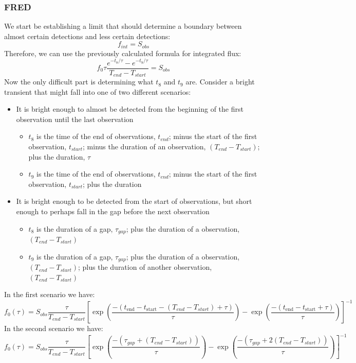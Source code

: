 \documentclass{article}
\begin{document}
\subsubsection{FRED}
We start be establishing a limit that should determine a boundary between almost certain detections and less certain detections:
\[f_{int} = S_{obs}\]
Therefore, we can use the previously calculated formula for integrated flux:
\[f_0\tau \frac{e^{-t_{8}/\tau}-e^{-t_{9}/\tau}}{T_{end}-T_{start}} = S_{obs}\]
Now the only difficult part is determining what $t_8$ and $t_9$ are. Consider a bright transient that might fall into one of two different scenarios:
\begin{itemize}
	\item It is bright enough to almost be detected from the beginning of the first observation until the last observation \begin{itemize}
		\item $t_8$ is the time of the end of observations, $t_{end}$; minus the start of the first observation, $t_{start}$; minus the duration of an observation, $(T_{end}-T_{start})$; plus the duration, $\tau$
		\item $t_9$ is the time of the end of observations,  $t_{end}$; minus the start of the first observation, $t_{start}$; plus the duration
		\end{itemize}
	\item It is bright enough to be detected from the start of observations, but short enough to perhaps fall in the gap before the next observation\begin{itemize}
		\item $t_8$ is the duration of a gap, $\tau_{gap}$; plus the duration of a observation, $(T_{end}-T_{start})$
		\item $t_9$ is the duration of a gap, $\tau_{gap}$; plus the duration of a observation, $(T_{end}-T_{start})$; plus the duration of another observation, $(T_{end}-T_{start})$
	\end{itemize} 
	\end{itemize}

In the first scenario we have:
\[f_0(\tau) = S_{obs}\frac{\tau}{T_{end}-T_{start}}[\exp(\frac{-(t_{\text{end}}-t_{\text{start}}-(T_{end}-T_{start})+ \tau )}{ \tau})-\exp(\frac{-(t_{\text{end}} - t_{\text{start}} + \tau)}{\tau})]^{-1}  \]
In the second scenario we have:
\[f_0(\tau) = S_{obs}\frac{\tau}{T_{end}-T_{start}}[\exp(\frac{-(\tau_{gap} + (T_{end}-T_{start}))}{ \tau})-\exp(\frac{-(\tau_{gap} + 2(T_{end}-T_{start}))}{\tau})]^{-1}\]
\end{document}
